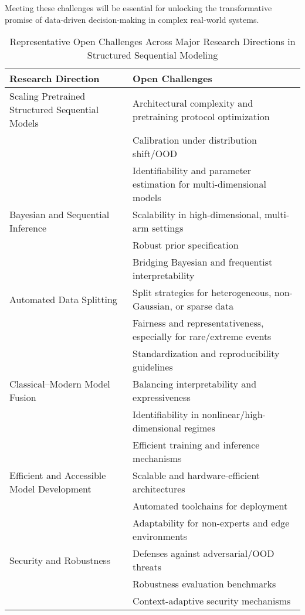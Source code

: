 Meeting these challenges will be essential for unlocking the transformative promise of data-driven decision-making in complex real-world systems.
\usepackage{array} 
\begin{table*}[htbp]
\centering
\caption{Representative Open Challenges Across Major Research Directions in Structured Sequential Modeling}
\label{tab:open_challenges}
\begin{adjustbox}{max width=\textwidth}
\begin{tabular}{>{\raggedright\arraybackslash}p{4.2cm} >{\raggedright\arraybackslash}p{12.8cm}}
\toprule
\textbf{Research Direction} & \textbf{Open Challenges} \\
\midrule
Scaling Pretrained Structured Sequential Models &
Architectural complexity and pretraining protocol optimization \\
& Calibration under distribution shift/OOD \\
& Identifiability and parameter estimation for multi-dimensional models \\
\addlinespace
Bayesian and Sequential Inference &
Scalability in high-dimensional, multi-arm settings \\
& Robust prior specification \\
& Bridging Bayesian and frequentist interpretability \\
\addlinespace
Automated Data Splitting &
Split strategies for heterogeneous, non-Gaussian, or sparse data \\
& Fairness and representativeness, especially for rare/extreme events \\
& Standardization and reproducibility guidelines \\
\addlinespace
Classical--Modern Model Fusion &
Balancing interpretability and expressiveness \\
& Identifiability in nonlinear/high-dimensional regimes \\
& Efficient training and inference mechanisms \\
\addlinespace
Efficient and Accessible Model Development &
Scalable and hardware-efficient architectures \\
& Automated toolchains for deployment \\
& Adaptability for non-experts and edge environments \\
\addlinespace
Security and Robustness &
Defenses against adversarial/OOD threats \\
& Robustness evaluation benchmarks \\
& Context-adaptive security mechanisms \\

\end{tabular}
\end{adjustbox}
\end{table*}
